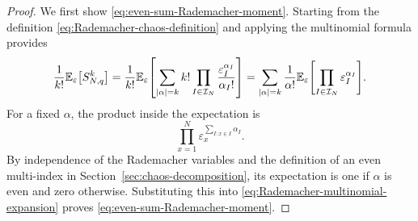 \documentclass[../CLT_SYK.tex]{subfiles}
\begin{document}
\begin{proof}
  We first show \eqref{eq:even-sum-Rademacher-moment}.
  Starting from the definition \eqref{eq:Rademacher-chaos-definition}
  and applying the multinomial formula provides
  \begin{equation}\label{eq:Rademacher-multinomial-expansion}
    \frac{1}{k!}\E_\varepsilon\mleft[S_{N,q}^k\mright]
    =\frac{1}{k!}\E_\varepsilon\mleft[
      \sum_{|\alpha|=k}k!
      \prod_{I\in\calI_N}\frac{\varepsilon_I^{\alpha_I}}{\alpha_I!}
    \mright]
    =
    \sum_{|\alpha|=k}\frac{1}{\alpha!}
    \E_\varepsilon\mleft[
      \prod_{I\in\calI_N}\varepsilon_I^{\alpha_I}
    \mright].
  \end{equation}
  For a fixed $\alpha$, the product inside the expectation is
  \begin{equation*}
    \prod_{x=1}^N
    \varepsilon_x^{\sum_{I: x\in I}\alpha_I}.
  \end{equation*}
  By independence of the Rademacher variables and the definition of an even
  multi-index in Section~\ref{sec:chaos-decomposition}, its expectation is one if
  $\alpha$ is even and zero otherwise.  Substituting this into
  \eqref{eq:Rademacher-multinomial-expansion} proves
  \eqref{eq:even-sum-Rademacher-moment}.


\end{proof}
\end{document}
